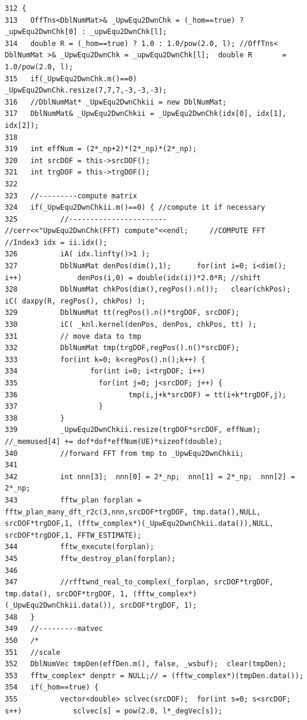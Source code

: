 \footnotesize\begin{verbatim}312 {
313   OffTns<DblNumMat>& _UpwEqu2DwnChk = (_hom==true) ? _upwEqu2DwnChk[0] : _upwEqu2DwnChk[l];
314   double R = (_hom==true) ? 1.0 : 1.0/pow(2.0, l); //OffTns< DblNumMat >& _UpwEqu2DwnChk = _upwEqu2DwnChk[l];  double R       = 1.0/pow(2.0, l);
315   if(_UpwEqu2DwnChk.m()==0)      _UpwEqu2DwnChk.resize(7,7,7,-3,-3,-3);
316   //DblNumMat* _UpwEqu2DwnChkii = new DblNumMat;
317   DblNumMat& _UpwEqu2DwnChkii = _UpwEqu2DwnChk(idx[0], idx[1], idx[2]);
318   
319   int effNum = (2*_np+2)*(2*_np)*(2*_np);
320   int srcDOF = this->srcDOF();
321   int trgDOF = this->trgDOF();
322   
323   //---------compute matrix
324   if(_UpwEqu2DwnChkii.m()==0) { //compute it if necessary
325          //-----------------------       //cerr<<"UpwEqu2DwnChk(FFT) compute"<<endl;     //COMPUTE FFT   //Index3 idx = ii.idx();        
326          iA( idx.linfty()>1 );
327          DblNumMat denPos(dim(),1);      for(int i=0; i<dim(); i++)             denPos(i,0) = double(idx(i))*2.0*R; //shift
328          DblNumMat chkPos(dim(),regPos().n());   clear(chkPos);  iC( daxpy(R, regPos(), chkPos) );
329          DblNumMat tt(regPos().n()*trgDOF, srcDOF);
330          iC( _knl.kernel(denPos, denPos, chkPos, tt) );
331          // move data to tmp
332          DblNumMat tmp(trgDOF,regPos().n()*srcDOF);
333          for(int k=0; k<regPos().n();k++) {
334                 for(int i=0; i<trgDOF; i++)
335                   for(int j=0; j<srcDOF; j++) {
336                          tmp(i,j+k*srcDOF) = tt(i+k*trgDOF,j);
337                   }
338          }
339          _UpwEqu2DwnChkii.resize(trgDOF*srcDOF, effNum); //_memused[4] += dof*dof*effNum(UE)*sizeof(double);
340          //forward FFT from tmp to _UpwEqu2DwnChkii;
341          
342          int nnn[3];  nnn[0] = 2*_np;  nnn[1] = 2*_np;  nnn[2] = 2*_np;
343          fftw_plan forplan = fftw_plan_many_dft_r2c(3,nnn,srcDOF*trgDOF, tmp.data(),NULL, srcDOF*trgDOF,1, (fftw_complex*)(_UpwEqu2DwnChkii.data()),NULL, srcDOF*trgDOF,1, FFTW_ESTIMATE);
344          fftw_execute(forplan);
345          fftw_destroy_plan(forplan);
346 
347          //rfftwnd_real_to_complex(_forplan, srcDOF*trgDOF, tmp.data(), srcDOF*trgDOF, 1, (fftw_complex*)(_UpwEqu2DwnChkii.data()), srcDOF*trgDOF, 1);
348   }
349   //---------matvec
350   /*
351   //scale
352   DblNumVec tmpDen(effDen.m(), false, _wsbuf);  clear(tmpDen);
353   fftw_complex* denptr = NULL;// = (fftw_complex*)(tmpDen.data());
354   if(_hom==true) {
355          vector<double> sclvec(srcDOF);  for(int s=0; s<srcDOF; s++)            sclvec[s] = pow(2.0, l*_degVec[s]);

\end{verbatim}
